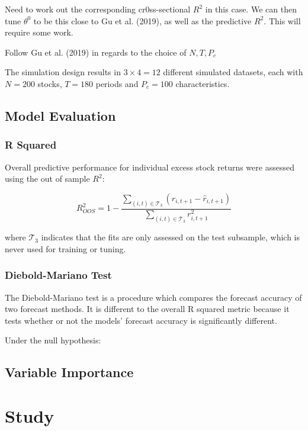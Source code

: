 \documentclass[man, a4paper, biblatex]{article}
\newcommand{\smalltodo}[2][] {\todo[caption={#2}, size=\scriptsize,%
	fancyline,#1]{\begin{spacing}{.5}#2\end{spacing}}}
\newcommand{\rhs}[2][]{\smalltodo[color=green!30,#1]{{\bf RS:} #2}}
\begin{document}
Need to work out the corresponding cr0ss-sectional $R^2$ in this case. We can then tune $\theta^0$ to be this close to Gu et al. (2019), as well as the predictive $R^2$. This will require some work. 

Follow Gu et al. (2019) in regards to the choice of $N,T,P_{c}$

The simulation design results in $3 \times 4 = 12$ different simulated datasets, each with $N = 200$ stocks, $T = 180$ periods and $P_c = 100$ characteristics.

\subsection{Model Evaluation}

\subsubsection{R Squared}

Overall predictive performance for individual excess stock returns were assessed using the out of sample $R^2$:

\begin{equation}
	R^2_{OOS} = 1 - \frac{\sum_{(i, t)\in\mathcal{T}_3}(r_{i, t+1} - \widehat{r}_{i, t+1})}{\sum_{(i, t)\in\mathcal{T}_3}r_{i, t+1}^2}
\end{equation}

where $\mathcal{T}_3$ indicates that the fits are only assessed on the test subsample, which is never used for training or tuning. 

\subsubsection{Diebold-Mariano Test}

The Diebold-Mariano test is a procedure which compares the forecast accuracy of two forecast methods. It is different to the overall R squared metric because it tests whether or not the models' forecast accuracy is significantly different. 

Under the null hypothesis:




\subsection{Variable Importance}

\rhs{Pending}

\section{Study}
\end{document}
